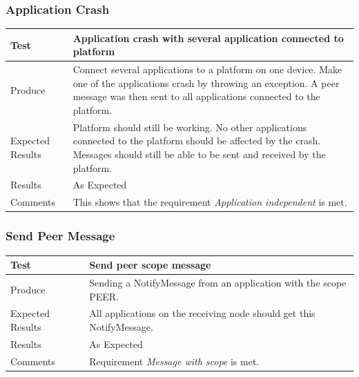 \subsubsection{Application Crash}
\begin{center}
    \begin{tabular}{ | l | p{12cm} |}
    \hline
    Test 	 				& 		 Application crash with several application connected to platform\\ \hline
	Produce  				& 		 Connect several applications to a platform on one device. Make one of the applications crash by throwing an exception. A peer message was then sent to all applications connected to the platform.\\ \hline
	Expected Results  		& 		 Platform should still be working. No other applications connected to the platform should be affected by the crash. Messages should still be able to be sent and received by the platform.\\ \hline
	Results 				& 		 As Expected\\ \hline
	Comments				& 		 This shows that the requirement \emph{Application independent} is met.\\ \hline
    \end{tabular}
\end{center}

\subsubsection{Send Peer Message}
\begin{center}
    \begin{tabular}{ | l | p{12cm} |}
    \hline
    Test 	 				& 		 Send peer scope message\\ \hline
	Produce  				& 		 Sending a NotifyMessage from an application with the scope PEER. \\ \hline
	Expected Results  		& 		 All applications on the receiving node should get this NotifyMessage.\\ \hline
	Results 				& 		 As Expected\\ \hline
	Comments				& 		 Requirement \emph{Message with scope} is met.\\ \hline
    \end{tabular}
\end{center}

